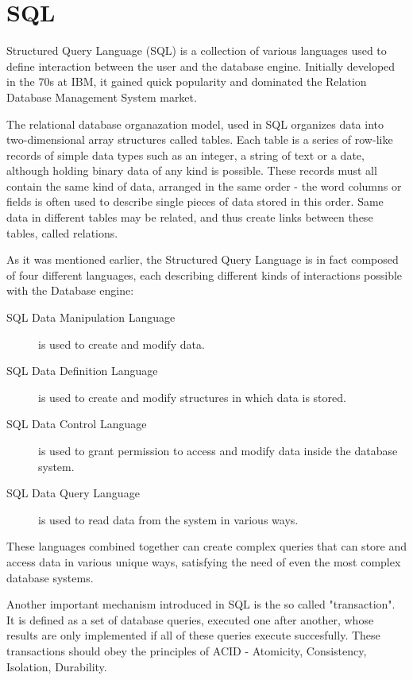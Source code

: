 \section{SQL}
\label{sec:background:first_section}
\par Structured Query Language (SQL) is a collection of various languages used to define interaction between the user and the database engine. Initially developed in the 70s at IBM, it gained quick popularity and dominated the Relation Database Management System market\citep{SQLHandbook}.
\par The relational database organazation model, used in SQL organizes data into two-dimensional array structures called tables. Each table is a series of row-like records of simple data types such as an integer, a string of text or a date, although holding binary data of any kind is possible. These records must all contain the same kind of data, arranged in the same order - the word columns or fields is often used to describe single pieces of data stored in this order. Same data in different tables may be related, and thus create links between these tables, called relations.
\par As it was mentioned earlier, the Structured Query Language is in fact composed of four different languages, each describing different kinds of interactions possible with the Database engine\citep{KreibchSQLite}:
\begin{description}
  \item[SQL Data Manipulation Language] is used to create and modify data.
  \item[SQL Data Definition Language] is used to create and modify structures in which data is stored.
  \item[SQL Data Control Language] is used to grant permission to access and modify data inside the database system.
  \item[SQL Data Query Language] is used to read data from the system in various ways.
\end{description}
\par These languages combined together can create complex queries that can store and access data in various unique ways, satisfying the need of even the most complex database systems.
\par Another important mechanism introduced in SQL is the so called "transaction". It is defined as a set of database queries, executed one after another, whose results are only implemented if all of these queries execute succesfully\citep{SQLHandbook}. These transactions should obey the principles of ACID - Atomicity, Consistency, Isolation, Durability\citep{ACID}.
